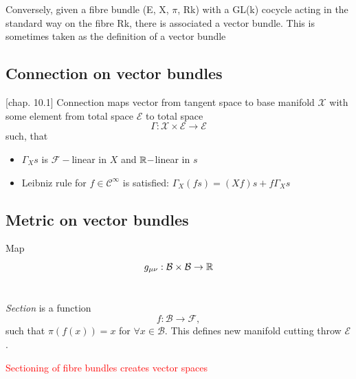 \section{}
Conversely, given a fibre bundle (E, X, $\pi$, Rk) with a GL(k) cocycle acting in the standard way on the fibre Rk, there is associated a vector bundle. This is sometimes taken as the definition of a vector bundle


\subsection{Connection on vector bundles}
\citep{lu}[chap. 10.1]
Connection maps vector from tangent space to base manifold $\mathcal{X}$ with some element from total space $\mathcal{E}$ to total space
$$\Gamma: \mathcal{X}\times \mathcal{E}\rightarrow \mathcal{E}$$
such, that
\begin{itemize}
    \item $\Gamma_X s$ is $\mathcal{F}-$linear in $X$ and $\mathbb{R}-$linear in $s$
    \item Leibniz rule for $f\in \mathcal{C}^\infty$ is satisfied: $\Gamma_X(f s) = (X f)s+f\Gamma_X s$
\end{itemize}


\subsection{Metric on vector bundles}
Map
$$g_{\mu\nu}: \mathcal{B}\times \mathcal{B} \rightarrow \mathbb{R}$$

\section{}
\label{sec:section}
\emph{Section} is a function
$$f:\mathcal{B}\rightarrow \mathcal{F},$$
such that $\pi(f(x))=x$ for $\forall x\in \mathcal{B}$. This defines new manifold cutting throw $\mathcal{E}$.

\textcolor{red}{Sectioning of fibre bundles creates vector spaces}



